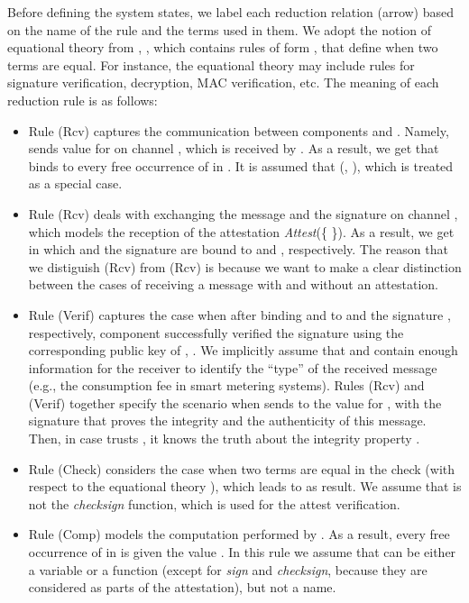 \documentclass{llncs}
\begin{document}
\noindent Before defining the system states, we label each reduction relation 
(arrow) based on the name of the rule and the terms used in them. 
We adopt the notion of equational theory  from \cite{fournet01mobile}, \cite{ryan:2011}, 
which contains rules of form     , that define when two terms are equal. For instance,  the 
equational theory  may include rules for signature verification, decryption, MAC verification, etc. The 
meaning of each reduction rule is as follows: 

\begin{itemize}
\item 
Rule (Rcv) captures the communication between components  and . 
Namely,  sends value  for  on channel , which is received by . As a result, 
we get  that binds  to every free occurrence of  in . It is 
assumed that   (, ), which is treated as a special case. 
\item 
Rule (Rcv) deals with exchanging the message  and the signature 
 on channel , which models the reception of the 
attestation \textit{Attest}(\{  \}). As a result, we get  in which 
 and the signature are bound to  and , respectively. The reason that 
we distiguish (Rcv) from (Rcv) is because we want to make a clear distinction 
between the cases of receiving a message with and without an attestation. 

\item 
Rule (Verif) captures the case when after binding  and  to 
 and the signature , respectively, component  successfully verified 
the signature using the corresponding public key of , . 
We implicitly assume that  and  contain enough information for the 
receiver to identify the ``type'' of the received message (e.g., the consumption fee in smart metering systems). 
Rules (Rcv) and (Verif) together specify the scenario when 
 sends to  the value  for , with the signature that proves the integrity 
and the authenticity of  this message. Then, in case  trusts , it knows 
the truth about the integrity property   . 


\item 
Rule (Check) considers the case when two terms are equal in the check 
(with respect to the equational theory ), which leads to  as result. We assume that 
 is not the \textit{checksign} function, which is used for the attest verification.   

\item 
Rule (Comp) models the computation    performed by .
As a result, every free occurrence of  in  is given the value . 
In this rule we assume that  can be either a variable or a function (except for 
\textit{sign} and \textit{checksign}, because they are considered as parts of the attestation), 
but not a name. 


\end{itemize}
\end{document}
